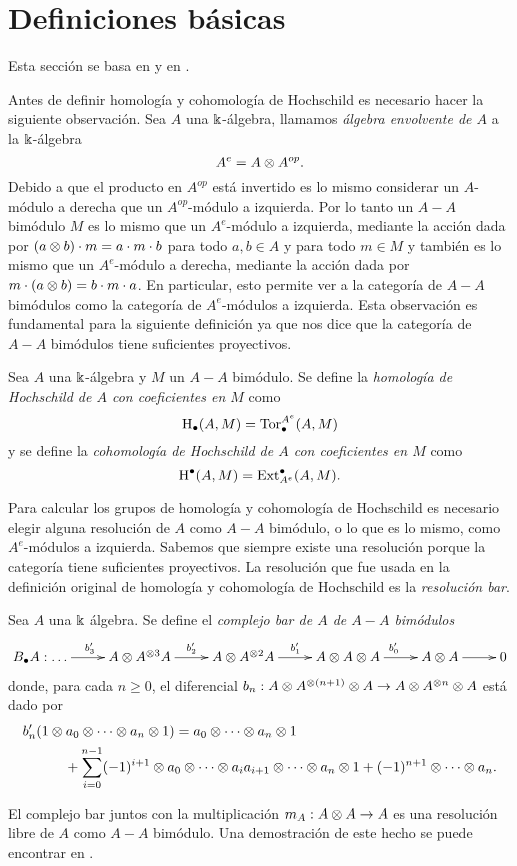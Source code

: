 \documentclass[a4paper,oneside,fleqn,11pt,../tesis.tex]{subfiles}
\begin{document}
\section{Definiciones básicas}
Esta sección se basa en  y en .

Antes de definir homología y cohomología de Hochschild es necesario hacer la siguiente observación.
Sea $A$ una $\Bbbk$-álgebra, llamamos \emph{álgebra envolvente de $A$} a la $\Bbbk$-álgebra
\[
	A^{e} = A \otimes A^{op}.
\]
Debido a que el producto en $A^{op}$ está invertido es lo mismo considerar un $A$-módulo a derecha que un $A^{op}$-módulo a izquierda.
Por lo tanto un $A-A$ bimódulo $M$ es lo mismo que un $A^{e}$-módulo a izquierda, mediante la acción dada por $(a\otimes b)\cdot m = a\cdot m \cdot b$
para todo $a, b \in A$ y para todo $m \in M$ y también es lo mismo que un $A^{e}$-módulo a derecha, mediante la acción dada por $m \cdot (a \otimes b) = b\cdot m \cdot a$.
En particular, esto permite ver a la categoría de $A-A$ bimódulos como la categoría de $A^e$-módulos a izquierda.
Esta observación es fundamental para la siguiente definición ya que nos dice que la categoría de $A-A$ bimódulos
tiene suficientes proyectivos.

\begin{definition}
	Sea $A$ una $\Bbbk$-álgebra y $M$ un $A-A$ bimódulo. Se define la \emph{homología de Hochschild de $A$ con coeficientes en $M$} como
		\[
			\operatorname{H}_{\bullet}(A,M) = \operatorname{Tor}_{\bullet}^{A^e}(A, M)	
		\]
	y se define la \emph{cohomología de Hochschild de $A$ con coeficientes en $M$} como
	\[
			\operatorname{H}^{\bullet}(A,M) = \operatorname{Ext}^{\bullet}_{A^e}(A, M).	
	\]
\end{definition}

Para calcular los grupos de homología y cohomología de Hochschild es necesario elegir alguna resolución de $A$ como $A-A$ bimódulo,
o lo que es lo mismo, como $A^e$-módulos a izquierda. Sabemos que siempre existe una resolución porque la categoría tiene suficientes
proyectivos. La resolución que fue usada en la definición original de homología y cohomología de Hochschild es la \emph{resolución bar}.
\begin{definition}
	Sea $A$ una $\Bbbk$ álgebra. Se define el \emph{complejo bar de $A$ de $A-A$ bimódulos}
	\begin{align*}
		\xymatrix{
			B_{\bullet}A:\ldots \ar[r]^{b'_3} &  A \ox A^{\ox 3} A \ar[r]^{b'_2} & A \ox A^{\ox 2} A \ar[r]^{b'_1}
				& A \ox A \ox A \ar[r]^{b'_0} & A \ox A \ar[r] & 0 
		}
	\end{align*}
	donde, para cada $n \geq 0$, el diferencial $b_n: A \otimes A^{\otimes (n + 1)} \otimes A \to A \otimes A^{\otimes n} \otimes A$ está dado por
	\begin{align*}
		b'_n&(1\otimes a_0 \otimes \cdots \otimes a_n \otimes 1) = a_0 \otimes \cdots \otimes a_n \otimes 1 \\
		 & \qquad + \sum_{i = 0}^{n -1}(-1)^{i + 1} \otimes a_0 \otimes \cdots \otimes a_i a_{i + 1} \otimes \cdots \otimes a_n \otimes 1 + (-1)^{n + 1} \otimes \cdots \otimes a_n.
	\end{align*}
\end{definition}
El complejo bar juntos con la multiplicación $m_A: A \otimes A \to A$ es una resolución libre de $A$ como $A-A$ bimódulo. Una demostración de este hecho se puede encontrar en \myworries{[CE]}.
\end{document}
